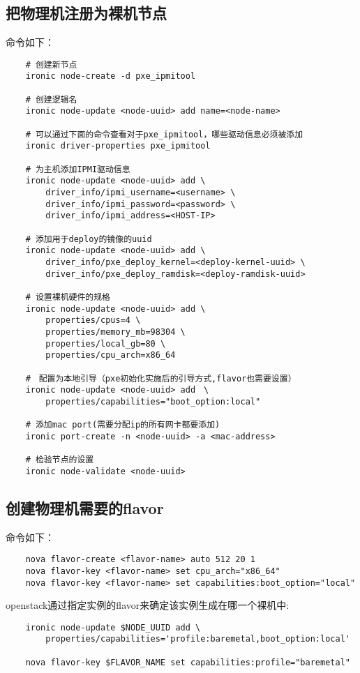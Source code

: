 \documentclass[a4paper,left=1.5cm,right=1.5cm,11pt]{article}
\begin{document}
\subsection{把物理机注册为裸机节点}
	命令如下：
	\begin{lstlisting}
	# 创建新节点
	ironic node-create -d pxe_ipmitool

	# 创建逻辑名
	ironic node-update <node-uuid> add name=<node-name>

	# 可以通过下面的命令查看对于pxe_ipmitool，哪些驱动信息必须被添加
	ironic driver-properties pxe_ipmitool

	# 为主机添加IPMI驱动信息
	ironic node-update <node-uuid> add \ 
		driver_info/ipmi_username=<username> \ 
		driver_info/ipmi_password=<password> \ 
		driver_info/ipmi_address=<HOST-IP>

	# 添加用于deploy的镜像的uuid
	ironic node-update <node-uuid> add \ 
		driver_info/pxe_deploy_kernel=<deploy-kernel-uuid> \ 
		driver_info/pxe_deploy_ramdisk=<deploy-ramdisk-uuid>

	# 设置裸机硬件的规格
	ironic node-update <node-uuid> add \
		properties/cpus=4 \ 
		properties/memory_mb=98304 \ 
		properties/local_gb=80 \ 
		properties/cpu_arch=x86_64

	#　配置为本地引导（pxe初始化实施后的引导方式,flavor也需要设置）
	ironic node-update <node-uuid> add　\
		properties/capabilities="boot_option:local"

	# 添加mac port(需要分配ip的所有网卡都要添加)
	ironic port-create -n <node-uuid> -a <mac-address>
	
	# 检验节点的设置
	ironic node-validate <node-uuid>
	\end{lstlisting}

\subsection{创建物理机需要的flavor}
	命令如下：
	\begin{lstlisting}
	nova flavor-create <flavor-name> auto 512 20 1
	nova flavor-key <flavor-name> set cpu_arch="x86_64"
	nova flavor-key <flavor-name> set capabilities:boot_option="local"
	\end{lstlisting}

	openstack通过指定实例的flavor来确定该实例生成在哪一个裸机中:
	\begin{lstlisting}
	ironic node-update $NODE_UUID add \ 
		properties/capabilities='profile:baremetal,boot_option:local'
	
	nova flavor-key $FLAVOR_NAME set capabilities:profile="baremetal"
	\end{lstlisting}
\end{document}
